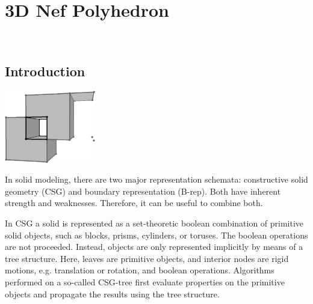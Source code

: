 
\ccParDims

\chapter{3D Nef Polyhedron}
\label{chapterNef_3}
\\

\minitoc

\section{Introduction}

\begin{ccTexOnly}
    \vspace*{-20mm}
    \begin{flushright}
      \parbox{0.3\textwidth}{%
          \includegraphics[width=0.3\textwidth]{Nef_3/fig/nef_non_manifold3a.ps}%
      }%
    \end{flushright}
\end{ccTexOnly}

In solid modeling, there are two major representation schemata: constructive
solid geometry (CSG) and boundary representation (B-rep). Both have inherent
strength and weaknesses. Therefore, it can be useful to combine both.

In CSG a solid is represented as a set-theoretic boolean combination of
primitive solid objects, such as blocks, prisms, cylinders, or toruses.
The boolean operations are not proceeded. Instead, objects are only
represented implicitly by means of a tree structure. Here, leaves are
primitive objects, and interior nodes are rigid motions, e.g. translation
or rotation, and boolean operations. Algorithms performed on a so-called 
CSG-tree first evaluate properties on the primitive objects and propagate 
the results using the tree structure.
 
